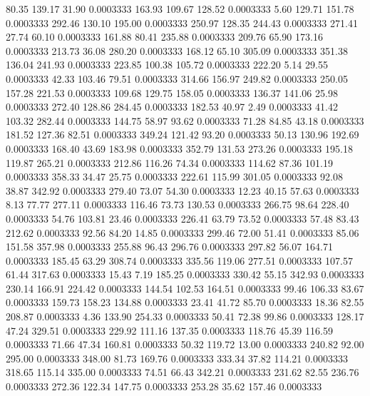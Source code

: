   80.35  139.17   31.90   0.0003333
 163.93  109.67  128.52   0.0003333
   5.60  129.71  151.78   0.0003333
 292.46  130.10  195.00   0.0003333
 250.97  128.35  244.43   0.0003333
 271.41   27.74   60.10   0.0003333
 161.88   80.41  235.88   0.0003333
 209.76   65.90  173.16   0.0003333
 213.73   36.08  280.20   0.0003333
 168.12   65.10  305.09   0.0003333
 351.38  136.04  241.93   0.0003333
 223.85  100.38  105.72   0.0003333
 222.20    5.14   29.55   0.0003333
  42.33  103.46   79.51   0.0003333
 314.66  156.97  249.82   0.0003333
 250.05  157.28  221.53   0.0003333
 109.68  129.75  158.05   0.0003333
 136.37  141.06   25.98   0.0003333
 272.40  128.86  284.45   0.0003333
 182.53   40.97    2.49   0.0003333
  41.42  103.32  282.44   0.0003333
 144.75   58.97   93.62   0.0003333
  71.28   84.85   43.18   0.0003333
 181.52  127.36   82.51   0.0003333
 349.24  121.42   93.20   0.0003333
  50.13  130.96  192.69   0.0003333
 168.40   43.69  183.98   0.0003333
 352.79  131.53  273.26   0.0003333
 195.18  119.87  265.21   0.0003333
 212.86  116.26   74.34   0.0003333
 114.62   87.36  101.19   0.0003333
 358.33   34.47   25.75   0.0003333
 222.61  115.99  301.05   0.0003333
  92.08   38.87  342.92   0.0003333
 279.40   73.07   54.30   0.0003333
  12.23   40.15   57.63   0.0003333
   8.13   77.77  277.11   0.0003333
 116.46   73.73  130.53   0.0003333
 266.75   98.64  228.40   0.0003333
  54.76  103.81   23.46   0.0003333
 226.41   63.79   73.52   0.0003333
  57.48   83.43  212.62   0.0003333
  92.56   84.20   14.85   0.0003333
 299.46   72.00   51.41   0.0003333
  85.06  151.58  357.98   0.0003333
 255.88   96.43  296.76   0.0003333
 297.82   56.07  164.71   0.0003333
 185.45   63.29  308.74   0.0003333
 335.56  119.06  277.51   0.0003333
 107.57   61.44  317.63   0.0003333
  15.43    7.19  185.25   0.0003333
 330.42   55.15  342.93   0.0003333
 230.14  166.91  224.42   0.0003333
 144.54  102.53  164.51   0.0003333
  99.46  106.33   83.67   0.0003333
 159.73  158.23  134.88   0.0003333
  23.41   41.72   85.70   0.0003333
  18.36   82.55  208.87   0.0003333
   4.36  133.90  254.33   0.0003333
  50.41   72.38   99.86   0.0003333
 128.17   47.24  329.51   0.0003333
 229.92  111.16  137.35   0.0003333
 118.76   45.39  116.59   0.0003333
  71.66   47.34  160.81   0.0003333
  50.32  119.72   13.00   0.0003333
 240.82   92.00  295.00   0.0003333
 348.00   81.73  169.76   0.0003333
 333.34   37.82  114.21   0.0003333
 318.65  115.14  335.00   0.0003333
  74.51   66.43  342.21   0.0003333
 231.62   82.55  236.76   0.0003333
 272.36  122.34  147.75   0.0003333
 253.28   35.62  157.46   0.0003333

